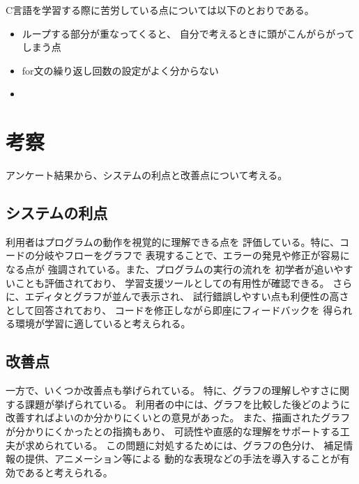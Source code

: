 \documentclass{cssspaper}
\begin{document}
        C言語を学習する際に苦労している点については以下のとおりである。

        \begin{itemize}
            \item ループする部分が重なってくると、
            自分で考えるときに頭がこんがらがってしまう点
            
            \item for文の繰り返し回数の設定がよく分からない
            
            \item 
        \end{itemize}

        \section{考察}
        アンケート結果から、システムの利点と改善点について考える。

        \subsection{システムの利点}
        利用者はプログラムの動作を視覚的に理解できる点を
        評価している。特に、コードの分岐やフローをグラフで
        表現することで、エラーの発見や修正が容易になる点が
        強調されている。また、プログラムの実行の流れを
        初学者が追いやすいことも評価されており、
        学習支援ツールとしての有用性が確認できる。
        さらに、エディタとグラフが並んで表示され、
        試行錯誤しやすい点も利便性の高さとして回答されており、
        コードを修正しながら即座にフィードバックを
        得られる環境が学習に適していると考えられる。

        \subsection{改善点}
        一方で、いくつか改善点も挙げられている。
        特に、グラフの理解しやすさに関する課題が挙げられている。
        利用者の中には、グラフを比較した後どのように
        改善すればよいのか分かりにくいとの意見があった。
        また、描画されたグラフが分かりにくかったとの指摘もあり、
        可読性や直感的な理解をサポートする工夫が求められている。
        この問題に対処するためには、グラフの色分け、
        補足情報の提供、アニメーション等による
        動的な表現などの手法を導入することが有効であると考えられる。
\end{document}
